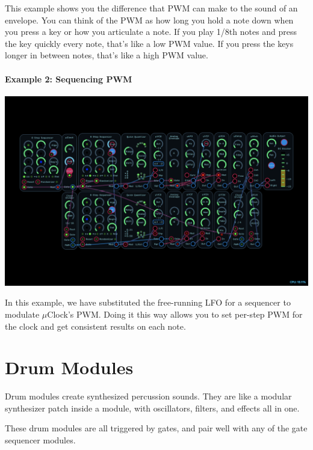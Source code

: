 \documentclass[11pt]{book}
\begin{document}
\begin{multicols*}{2}
This example shows you the difference that PWM can make to the sound of an envelope. You can think of the PWM as how long you hold a note down when you press a key or how you articulate a note. If you play 1/8th notes and press the key quickly every note, that's like a low PWM value. If you press the keys longer in between notes, that's like a high PWM value.

\subsubsection*{Example 2: Sequencing PWM}

\begin{center}
\includegraphics[width=0.95\linewidth]{uclock-fig2.png}
\end{center}

In this example, we have substituted the free-running LFO for a sequencer to modulate $\mu$Clock's PWM. Doing it this way allows you to set per-step PWM for the clock and get consistent results on each note.

\end{multicols*}

\pagebreak


\chapter{Drum Modules}

Drum modules create synthesized percussion sounds. They are like a modular synthesizer patch inside a module, with oscillators, filters, and effects all in one.

These drum modules are all triggered by gates, and pair well with any of the gate sequencer modules.

\pagebreak
\end{document}
